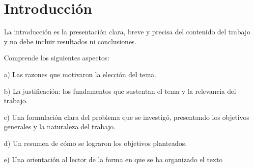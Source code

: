 \chapter*{Introducción}

La introducción es la presentación clara, breve y precisa del contenido del trabajo y no debe incluir
resultados ni conclusiones.

Comprende los siguientes aspectos:

a) Las razones que motivaron la elección del tema.

b) La justificación: los fundamentos que sustentan el tema y la relevancia del trabajo.

c) Una formulación clara del problema que se investigó, presentando los objetivos generales y la naturaleza del trabajo.

d) Un resumen de cómo se lograron los objetivos planteados.

e) Una orientación al lector de la forma en que se ha organizado el texto